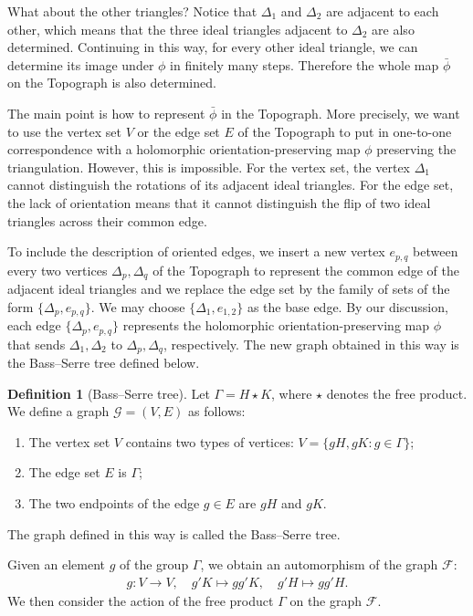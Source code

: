 \documentclass[10pt, a4paper]{article}
\theoremstyle{definition}
\newtheorem{definition}[theorem]{Definition}
\theoremstyle{remark}
\begin{document}
What about the other triangles? Notice that \(\Delta_1\) and \(\Delta_2\) are adjacent to each other, which means that the three ideal triangles adjacent to \(\Delta_2\) are also determined.
Continuing in this way, for every other ideal triangle, we can determine its image under \(\phi\) in finitely many steps. Therefore the whole map \(\bar{\phi}\) on the Topograph is also determined.

The main point is how to represent \(\bar{\phi}\) in the Topograph. More precisely, we want to use the vertex set \(V\) or the edge set \(E\) of the Topograph to put in one-to-one correspondence with a holomorphic orientation-preserving map \(\phi\) preserving the triangulation.
However, this is impossible. For the vertex set, the vertex \(\Delta_1\) cannot distinguish the rotations of its adjacent ideal triangles. For the edge set, the lack of orientation means that it cannot distinguish the flip of two ideal triangles across their common edge.

To include the description of oriented edges, we insert a new vertex \(e_{p,q}\) between every two vertices \(\Delta_p,\Delta_q\) of the Topograph to represent the common edge of the adjacent ideal triangles and we replace the edge set by the family of sets of the form \(\{\Delta_p,e_{p,q}\}\).
We may choose \(\{\Delta_1,e_{1,2}\}\) as the base edge. By our discussion, each edge \(\{\Delta_p,e_{p,q}\}\) represents the holomorphic orientation-preserving map \(\phi\) that sends \(\Delta_1,\Delta_2\) to \(\Delta_p,\Delta_q\), respectively.
The new graph obtained in this way is the Bass--Serre tree defined below.

\begin{definition}[Bass--Serre tree]
    Let \(\Gamma = H \star K\), where \(\star\) denotes the free product. We define a graph \(\mathcal{G} = (V,E)\) as follows:
    \begin{enumerate}
        \item The vertex set \(V\) contains two types of vertices: \(V=\{gH,gK: g \in\Gamma\}\);
        \item The edge set \(E\) is \(\Gamma\);
        \item The two endpoints of the edge \(g\in E\) are \(gH\) and \(gK\).
    \end{enumerate}
    The graph defined in this way is called the Bass--Serre tree.
\end{definition}

Given an element \(g\) of the group \(\Gamma\), we obtain an automorphism of the graph \(\mathcal{F}\):
\begin{align*}
    g: V \to V ,\quad g'K \mapsto gg'K ,\quad g'H \mapsto gg'H.
\end{align*} 
We then consider the action of the free product \(\Gamma\) on the graph \(\mathcal{F}\).
\end{document}
